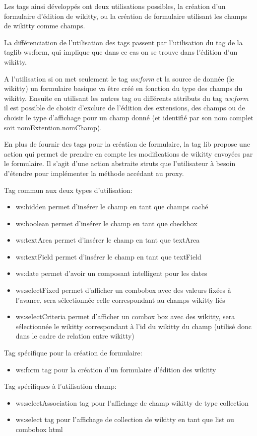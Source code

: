 Les tags ainsi développés ont deux utilisations possibles, la création d'un 
formulaire d'édition de wikitty, ou la création de formulaire utilisant les 
champs de wikitty comme champs. 

La différenciation de l'utilisation des tags passent par l'utilisation du tag 
de la taglib ws:form, qui implique que dans ce cas on se trouve dans l'édition d'un
wikitty.

A l'utilisation si on met seulement le tag \emph{ws:form} et la source de donnée 
(le wikitty) un formulaire basique va être créé en fonction du type des champs
du wikitty. Ensuite en utilisant les autres tag ou différents attributs du tag 
\emph{ws:form} il est possible de choisir d'exclure de l'édition des extensions,
des champs ou de choisir le type d'affichage pour un champ donné (et identifié
par son nom complet soit nomExtention.nomChamp).

En plus de fournir des tags pour la création de formulaire, la tag lib propose 
une action qui permet de prendre en compte les modifications de wikitty envoyées
par le formulaire. Il s'agit d'une action abstraite struts que l'utilisateur à 
besoin d'étendre pour implémenter la méthode accédant au proxy.

Tag commun aux deux types d'utilisation:
\begin{itemize}
\item ws:hidden permet d'insérer le champ en tant que champs caché
\item ws:boolean permet d'insérer le champ en tant que checkbox 
\item ws:textArea permet d'insérer le champ en tant que textArea
\item ws:textField permet d'insérer le champ en tant que textField
\item ws:date permet d'avoir un composant intelligent pour les dates 
\item ws:selectFixed permet d'afficher un combobox avec des valeurs fixées à 
l'avance, sera sélectionnée celle correspondant au champs wikitty liés
\item ws:selectCriteria permet d'afficher un combox box avec des wikitty, 
sera sélectionnée le wikitty correspondant à l'id du wikitty du champ
(utilisé donc dans le cadre de relation entre wikitty)\\
\end{itemize}

Tag spécifique pour la création de formulaire:
\begin{itemize}
\item ws:form tag pour la création d'un formulaire d'édition des wikitty \\
\end{itemize}

Tag spécifiques à l'utilisation champ:
\begin{itemize}
\item ws:selectAssociation tag pour l'affichage de champ wikitty de type collection
\item ws:select tag pour l'affichage de collection de wikitty en tant que list ou combobox html
\end{itemize}




